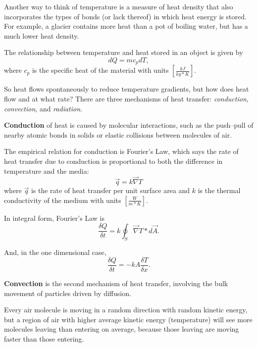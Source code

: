 \documentclass[10pt, twocolumn]{article}
\begin{document}
Another way to think of temperature is a measure of heat density that also
incorporates the types of bonds (or lack thereof) in which heat energy is stored.
For example, a glacier contains more heat than a pot of boiling water, but
has a much lower heat density.

The relationship between temperature and heat stored in an object is given by
\begin{equation}
dQ=mc_{p}dT,
\label{specific-heat-eq}
\end{equation}
where $c_{p}$ is the specific heat of the material with units $\left[\frac{kJ}{kg*K}\right]$.

So heat flows spontaneously to reduce
temperature gradients, but how does heat flow and at what rate?
There are three mechanisms of heat transfer:
\emph{conduction}, \emph{convection}, and \emph{radiation}.

\textbf{Conduction} of heat is caused by molecular interactions,
such as the push--pull of nearby atomic bonds in solids or
elastic collisions between molecules of air.

The empirical relation for conduction is Fourier's Law, which
says the rate of heat transfer due to conduction is proportional
to both the difference in temperature and the media:
\begin{equation*}
\vec{q}=k\vec{\nabla}T
\end{equation*}
where $\vec{q}$ is the rate of heat transfer per unit surface area
and $k$ is the thermal conductivity of the medium with units
$\left[\frac{W}{m*K}\right]$.

In integral form, Fourier's Law is
\begin{equation*}
\frac{\delta Q}{\delta t}=k\oint_{S}\vec{\nabla}T*d\vec{A}.
\end{equation*}

And, in the one dimensional case,
\begin{equation}
\frac{\delta Q}{\delta t}=-kA\frac{\delta T}{\delta x}.
\label{1D-fouriers-law-eq}
\end{equation}

\textbf{Convection} is the second mechanism of heat transfer,
involving the bulk movement of particles driven by diffusion.

Every air molecule is moving in a random direction with random
kinetic energy, but a region of air with higher average kinetic
energy (temperature) will see more molecules leaving than entering
on average, because those leaving are moving faster than those
entering.
\end{document}
